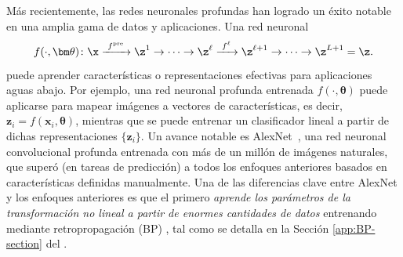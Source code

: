 \documentclass[../../book-main.tex]{subfiles}
\begin{document}
Más recientemente, las redes neuronales profundas han logrado un éxito notable
en una amplia gama de datos y aplicaciones. Una red neuronal
\begin{equation}
    f(\cdot, \bm \theta) \colon \x
    \xrightarrow{\hspace{1mm} f^{\mathrm{pre}} \hspace{1mm}} \z^1
    \rightarrow \cdots
    \rightarrow \z^\ell \xrightarrow{\hspace{1mm} f^\ell \hspace{1mm}}
    \z^{\ell+1} \rightarrow  \cdots \to \z^{L+1} = \z.
\end{equation}
puede aprender características o representaciones efectivas para aplicaciones aguas abajo.
Por ejemplo, una red neuronal profunda entrenada $f(\cdot,
\bm \theta)$ puede aplicarse para mapear imágenes a vectores de características, es
decir, $\bm{z}_i = f(\bm{x}_i,\bm \theta)$, mientras que se puede entrenar un clasificador lineal
a partir de dichas representaciones $\{\bm{z}_i\}$. Un
avance notable es AlexNet~\cite{krizhevsky2012imagenet}, una red neuronal
convolucional profunda entrenada con más de un millón de imágenes
naturales, que superó (en tareas de predicción) a todos los enfoques
anteriores basados en características definidas manualmente. Una de las diferencias clave
entre AlexNet y los enfoques anteriores es que el
primero \textit{aprende los parámetros de la transformación no lineal a partir de
enormes cantidades de datos} entrenando mediante retropropagación (BP)
\cite{Back-Prop}, tal como se detalla en la Sección \ref{app:BP-section} del
.
\end{document}
